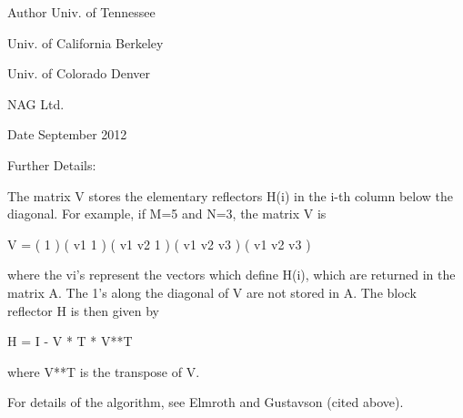 \begin{DoxyAuthor}{Author}
Univ. of Tennessee 

Univ. of California Berkeley 

Univ. of Colorado Denver 

N\+A\+G Ltd. 
\end{DoxyAuthor}
\begin{DoxyDate}{Date}
September 2012 
\end{DoxyDate}
\begin{DoxyParagraph}{Further Details\+: }
\begin{DoxyVerb}  The matrix V stores the elementary reflectors H(i) in the i-th column
  below the diagonal. For example, if M=5 and N=3, the matrix V is

               V = (  1       )
                   ( v1  1    )
                   ( v1 v2  1 )
                   ( v1 v2 v3 )
                   ( v1 v2 v3 )

  where the vi's represent the vectors which define H(i), which are returned
  in the matrix A.  The 1's along the diagonal of V are not stored in A.  The
  block reflector H is then given by

               H = I - V * T * V**T

  where V**T is the transpose of V.

  For details of the algorithm, see Elmroth and Gustavson (cited above).\end{DoxyVerb}
 
\end{DoxyParagraph}
\hypertarget{group__doubleGEcomputational_gac47363c60e542f007e7b6e1d48f0273b}{}

